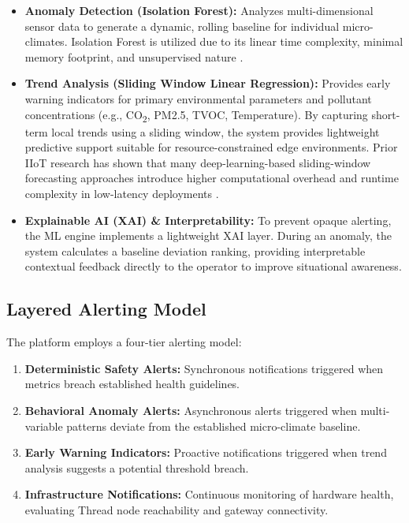 \documentclass[10pt,a4paper]{article}
\begin{document}
\begin{itemize}
  \item \textbf{Anomaly Detection (Isolation Forest):} Analyzes multi-dimensional sensor
    data to generate a dynamic, rolling baseline for individual micro-climates. Isolation
    Forest is utilized due to its linear time complexity, minimal memory footprint, and
    unsupervised nature \cite{ortega2025,wu2022}.
  \item \textbf{Trend Analysis (Sliding Window Linear Regression):} Provides early
    warning indicators for primary environmental parameters and pollutant concentrations
    (e.g., CO\textsubscript{2}, PM2.5, TVOC, Temperature). By capturing short-term local
    trends using a sliding window, the system provides lightweight predictive support
    suitable for resource-constrained edge environments. Prior IIoT research has shown
    that many deep-learning-based sliding-window forecasting approaches introduce higher
    computational overhead and runtime complexity in low-latency deployments \cite{guha2025}.
  \item \textbf{Explainable AI (XAI) \& Interpretability:} To prevent opaque alerting,
    the ML engine implements a lightweight XAI layer. During an anomaly, the system
    calculates a baseline deviation ranking, providing interpretable contextual feedback
    directly to the operator to improve situational awareness.
\end{itemize}

\subsection{Layered Alerting Model}

The platform employs a four-tier alerting model:

\begin{enumerate}
  \item \textbf{Deterministic Safety Alerts:} Synchronous notifications triggered when
    metrics breach established health guidelines.
  \item \textbf{Behavioral Anomaly Alerts:} Asynchronous alerts triggered when
    multi-variable patterns deviate from the established micro-climate baseline.
  \item \textbf{Early Warning Indicators:} Proactive notifications triggered when trend
    analysis suggests a potential threshold breach.
  \item \textbf{Infrastructure Notifications:} Continuous monitoring of hardware health,
    evaluating Thread node reachability and gateway connectivity.
\end{enumerate}
\end{document}
